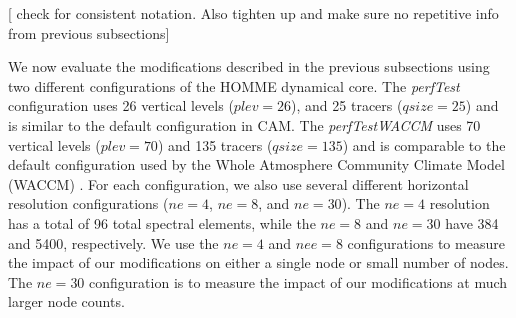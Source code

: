 

[{\color{red} check for consistent notation. Also tighten up and make sure no repetitive info from previous subsections}]


We now evaluate the modifications described in the previous subsections using two different configurations of the HOMME dynamical core.  The {\em perfTest} configuration uses 26 vertical levels ($plev=26$), and 25 tracers ($qsize=25$) and is similar to the default configuration in CAM.  The {\em perfTestWACCM} uses 70 vertical levels ($plev=70$) and 135 tracers ($qsize=135$) and is comparable to the default configuration used by the Whole Atmosphere Community Climate Model (WACCM) \cite{waccm}.  For each configuration, we also use several different horizontal resolution configurations ($ne=4$, $ne=8$, and $ne=30$). The $ne=4$ resolution has a total of 96 total spectral elements, while the $ne=8$ and $ne=30$ have 384 and 5400, respectively.  We use the $ne=4$ and $nee=8$ configurations to measure the impact of our modifications on either a single node or small number of nodes.  The $ne=30$ configuration is to measure the impact of our modifications at much larger node counts.  



